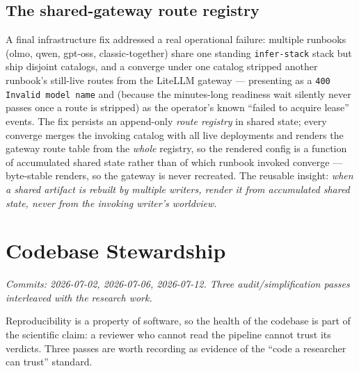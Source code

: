 \documentclass[11pt]{report}
\newcommand{\code}[1]{\texttt{#1}}
\begin{document}
\section{The shared-gateway route registry}

A final infrastructure fix addressed a real operational failure: multiple runbooks
(olmo, qwen, gpt-oss, classic-together) share one standing \code{infer-stack} stack
but ship disjoint catalogs, and a converge under one catalog stripped another
runbook's still-live routes from the LiteLLM gateway --- presenting as a
\code{400 Invalid model name} and (because the minutes-long readiness wait silently
never passes once a route is stripped) as the operator's known ``failed to acquire
lease'' events. The fix persists an append-only \emph{route registry} in shared
state; every converge merges the invoking catalog with all live deployments and
renders the gateway route table from the \emph{whole} registry, so the rendered
config is a function of accumulated shared state rather than of which runbook
invoked converge --- byte-stable renders, so the gateway is never recreated. The
reusable insight: \emph{when a shared artifact is rebuilt by multiple writers,
render it from accumulated shared state, never from the invoking writer's
worldview.}

\chapter{Codebase Stewardship}
\label{chap:stewardship}

\emph{Commits: 2026-07-02, 2026-07-06, 2026-07-12. Three audit/simplification
passes interleaved with the research work.}

Reproducibility is a property of software, so the health of the codebase is part of
the scientific claim: a reviewer who cannot read the pipeline cannot trust its
verdicts. Three passes are worth recording as evidence of the ``code a researcher
can trust'' standard.
\end{document}
